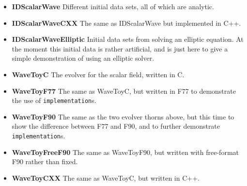 \documentclass{article}
\begin{document}
\begin{itemize}

\item{\bf IDScalarWave} Different initial data sets, all of which 
   are analytic. 

\item{\bf IDScalarWaveCXX} The same as IDScalarWave but implemented in C++. 

\item{\bf IDScalarWaveElliptic} Initial data sets from solving an 
   elliptic equation. At the moment this initial data is rather 
   artificial, and is just here to give a simple demonstration of
   using an elliptic solver.

\item{\bf WaveToyC} The evolver for the scalar field, written in C.

\item{\bf WaveToyF77} The same as WaveToyC, but written in F77 to 
   demonstrate the use of {\tt implementation}s.

\item{\bf WaveToyF90} The same as the two evolver thorns above, 
   but this time to show the difference between F77 and F90, and
   to further demonstrate {\tt implementation}s.

\item{\bf WaveToyFreeF90} The same as WaveToyF90, but written with 
   free-format F90 rather than fixed.

\item{\bf WaveToyCXX} The same as WaveToyC, but written in C++.


\end{itemize}
\end{document}
